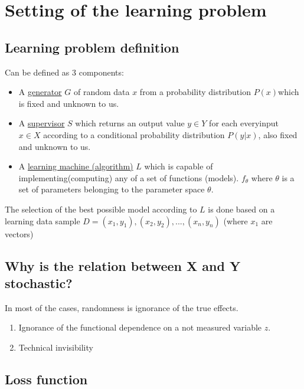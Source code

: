 \section{Setting of the learning problem}

\subsection{Learning problem definition}

Can be defined as 3 components:

\begin{itemize}
	\item
	      A \uline{generator} \(G\) of random data \(x\) from a
	      probability distribution \(P(x)\)which is fixed and unknown to us.
	\item
	      A \uline{supervisor} \(S\) which returns an output value ${y \in Y}$
	      for each everyinput \(x \in X\) according to a conditional
	      probability distribution \(P(y | x)\), also fixed and unknown
	      to us.
	\item
	      A \uline{learning machine (algorithm)} \(L\) which is capable of
	      implementing(computing) any of a set of functions (models).
	      \(f_\theta\) where \(\theta\) is a set of parameters belonging to the
	      parameter space \(\theta\).
\end{itemize}

The selection of the best possible model according to \(L\) is done
based on a learning data sample
\(D = {(x_1, y_1), (x_2, y_2), ..., (x_n, y_n)}\) (where \(x_1\) are
vectors)

\subsection{Why is the relation between X and Y stochastic?}

In most of the cases, randomness is ignorance of the true effects.

\begin{enumerate}
	\item
	      Ignorance of the functional dependence on a not measured variable
	      \(z\).
	\item
	      Technical invisibility
\end{enumerate}

\subsection{Loss function}

